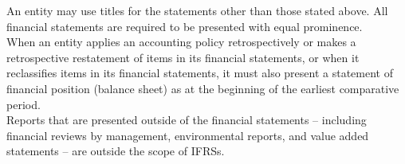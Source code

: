 An entity may use titles for the statements other than those stated above.  All financial statements are required to be presented with equal prominence. \\ 

When an entity applies an accounting policy retrospectively or makes a retrospective restatement of items in its financial statements, or when it reclassifies items in its financial statements, it must also present a statement of financial position (balance sheet) as at the beginning of the earliest comparative period. \\

Reports that are presented outside of the financial statements – including financial reviews by management, environmental reports, and value added statements – are outside the scope of IFRSs.